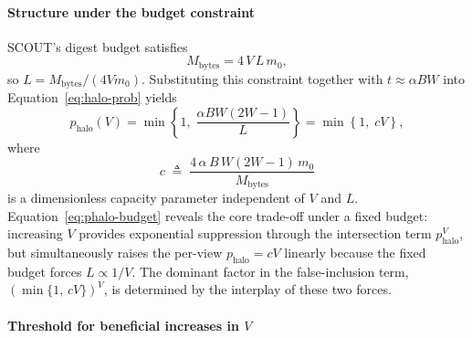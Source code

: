 \paragraph{Structure under the budget constraint}

SCOUT's digest budget satisfies
\begin{equation*}
M_{\text{bytes}} = 4\,V\,L\,m_0,
\end{equation*}
so $L = M_{\text{bytes}} / (4Vm_0)$. Substituting this constraint together with $t \approx \alpha BW$ into Equation~\eqref{eq:halo-prob} yields
\begin{equation}\label{eq:phalo-budget}
p_{\text{halo}}(V)
= \min\!\left\{1,\;\frac{\alpha BW(2W{-}1)}{L}\right\}
= \min\!\left\{1,\;cV\right\},
\end{equation}
where
\begin{equation}\label{eq:c-def}
c \;\triangleq\; \frac{4\,\alpha\,B\,W(2W{-}1)\,m_0}{M_{\text{bytes}}}
\end{equation}
is a dimensionless capacity parameter independent of $V$ and $L$. Equation~\eqref{eq:phalo-budget} reveals the core trade-off under a fixed budget: increasing $V$ provides exponential suppression through the intersection term $p_{\mathrm{halo}}^V$, but simultaneously raises the per-view $p_{\mathrm{halo}} = cV$ linearly because the fixed budget forces $L \propto 1/V$. The dominant factor in the false-inclusion term, $(\min\{1,\,cV\})^V$, is determined by the interplay of these two forces.

\paragraph{Threshold for beneficial increases in $V$}

